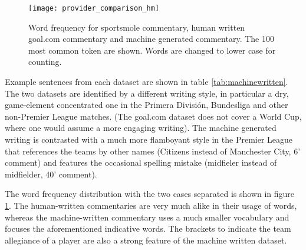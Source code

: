 \documentclass[10pt, a4paper]{UUThesisTemplate}
\begin{document}
\begin{figure}\centering
\texttt{[image: provider\_comparison\_hm]}
\caption{Word frequency for sportsmole commentary, human written goal.com commentary and machine generated commentary. The 100 most common token are shown. Words are changed to lower case for counting.}
\label{fig:frequencycomparisonhuman}
\end{figure}

Example sentences from each dataset are shown in table \ref{tab:machinewritten}. The two datasets are identified by a different writing style, in particular a dry, game-element concentrated one in the Primera División, Bundesliga and other non-Premier League matches. (The goal.com dataset does not cover a World Cup, where one would assume a more engaging writing). The machine generated writing is contrasted with a much more flamboyant style in the Premier League that references the teams by other names (Citizens instead of Manchester City, 6' comment) and features the occasional spelling mistake (midfieler instead of midfielder, 40' comment).

 The word frequency distribution with the two cases separated is shown in figure \ref{fig:frequencycomparisonhuman}. The human-written commentaries are very much alike in their usage of words, whereas the machine-written commentary uses a much smaller vocabulary and focuses the aforementioned indicative words. The brackets to indicate the team allegiance of a player are also a strong feature of the machine written dataset.
\end{document}
